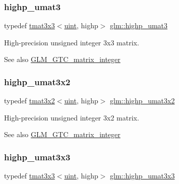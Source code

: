 \subsubsection{\texorpdfstring{highp\+\_\+umat3}{highp\_umat3}}
{\footnotesize\ttfamily typedef \hyperlink{structglm_1_1tmat3x3}{tmat3x3}$<$\hyperlink{group__core__precision_ga4fd29415871152bfb5abd588334147c8}{uint}, highp$>$ \hyperlink{group__gtc__matrix__integer_ga58bc8d0aeac88af0d38723b5cfa4fa67}{glm\+::highp\+\_\+umat3}}

High-\/precision unsigned integer 3x3 matrix. \begin{DoxySeeAlso}{See also}
\hyperlink{group__gtc__matrix__integer}{G\+L\+M\+\_\+\+G\+T\+C\+\_\+matrix\+\_\+integer} 
\end{DoxySeeAlso}
\mbox{\label{group__gtc__matrix__integer_ga7484178233773045088b42f362dade86}} 
\subsubsection{\texorpdfstring{highp\+\_\+umat3x2}{highp\_umat3x2}}
{\footnotesize\ttfamily typedef \hyperlink{structglm_1_1tmat3x2}{tmat3x2}$<$\hyperlink{group__core__precision_ga4fd29415871152bfb5abd588334147c8}{uint}, highp$>$ \hyperlink{group__gtc__matrix__integer_ga7484178233773045088b42f362dade86}{glm\+::highp\+\_\+umat3x2}}

High-\/precision unsigned integer 3x2 matrix. \begin{DoxySeeAlso}{See also}
\hyperlink{group__gtc__matrix__integer}{G\+L\+M\+\_\+\+G\+T\+C\+\_\+matrix\+\_\+integer} 
\end{DoxySeeAlso}
\mbox{\label{group__gtc__matrix__integer_ga770b01686af4fbbb13bbd7bd97d60fe4}} 
\subsubsection{\texorpdfstring{highp\+\_\+umat3x3}{highp\_umat3x3}}
{\footnotesize\ttfamily typedef \hyperlink{structglm_1_1tmat3x3}{tmat3x3}$<$\hyperlink{group__core__precision_ga4fd29415871152bfb5abd588334147c8}{uint}, highp$>$ \hyperlink{group__gtc__matrix__integer_ga770b01686af4fbbb13bbd7bd97d60fe4}{glm\+::highp\+\_\+umat3x3}}

